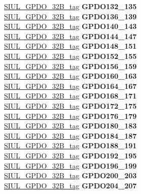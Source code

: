 \begin{DoxyCompactItemize}
\begin{tabbing}
\>\>\mbox{\hyperlink{unionSIUL__GPDO__32B__tag}{SIUL\_GPDO\_32B\_tag}} {\bfseries GPDO132\_135}\\
\>\>\mbox{\hyperlink{unionSIUL__GPDO__32B__tag}{SIUL\_GPDO\_32B\_tag}} {\bfseries GPDO136\_139}\\
\>\>\mbox{\hyperlink{unionSIUL__GPDO__32B__tag}{SIUL\_GPDO\_32B\_tag}} {\bfseries GPDO140\_143}\\
\>\>\mbox{\hyperlink{unionSIUL__GPDO__32B__tag}{SIUL\_GPDO\_32B\_tag}} {\bfseries GPDO144\_147}\\
\>\>\mbox{\hyperlink{unionSIUL__GPDO__32B__tag}{SIUL\_GPDO\_32B\_tag}} {\bfseries GPDO148\_151}\\
\>\>\mbox{\hyperlink{unionSIUL__GPDO__32B__tag}{SIUL\_GPDO\_32B\_tag}} {\bfseries GPDO152\_155}\\
\>\>\mbox{\hyperlink{unionSIUL__GPDO__32B__tag}{SIUL\_GPDO\_32B\_tag}} {\bfseries GPDO156\_159}\\
\>\>\mbox{\hyperlink{unionSIUL__GPDO__32B__tag}{SIUL\_GPDO\_32B\_tag}} {\bfseries GPDO160\_163}\\
\>\>\mbox{\hyperlink{unionSIUL__GPDO__32B__tag}{SIUL\_GPDO\_32B\_tag}} {\bfseries GPDO164\_167}\\
\>\>\mbox{\hyperlink{unionSIUL__GPDO__32B__tag}{SIUL\_GPDO\_32B\_tag}} {\bfseries GPDO168\_171}\\
\>\>\mbox{\hyperlink{unionSIUL__GPDO__32B__tag}{SIUL\_GPDO\_32B\_tag}} {\bfseries GPDO172\_175}\\
\>\>\mbox{\hyperlink{unionSIUL__GPDO__32B__tag}{SIUL\_GPDO\_32B\_tag}} {\bfseries GPDO176\_179}\\
\>\>\mbox{\hyperlink{unionSIUL__GPDO__32B__tag}{SIUL\_GPDO\_32B\_tag}} {\bfseries GPDO180\_183}\\
\>\>\mbox{\hyperlink{unionSIUL__GPDO__32B__tag}{SIUL\_GPDO\_32B\_tag}} {\bfseries GPDO184\_187}\\
\>\>\mbox{\hyperlink{unionSIUL__GPDO__32B__tag}{SIUL\_GPDO\_32B\_tag}} {\bfseries GPDO188\_191}\\
\>\>\mbox{\hyperlink{unionSIUL__GPDO__32B__tag}{SIUL\_GPDO\_32B\_tag}} {\bfseries GPDO192\_195}\\
\>\>\mbox{\hyperlink{unionSIUL__GPDO__32B__tag}{SIUL\_GPDO\_32B\_tag}} {\bfseries GPDO196\_199}\\
\>\>\mbox{\hyperlink{unionSIUL__GPDO__32B__tag}{SIUL\_GPDO\_32B\_tag}} {\bfseries GPDO200\_203}\\
\>\>\mbox{\hyperlink{unionSIUL__GPDO__32B__tag}{SIUL\_GPDO\_32B\_tag}} {\bfseries GPDO204\_207}\\

\end{tabbing}
\end{DoxyCompactItemize}
